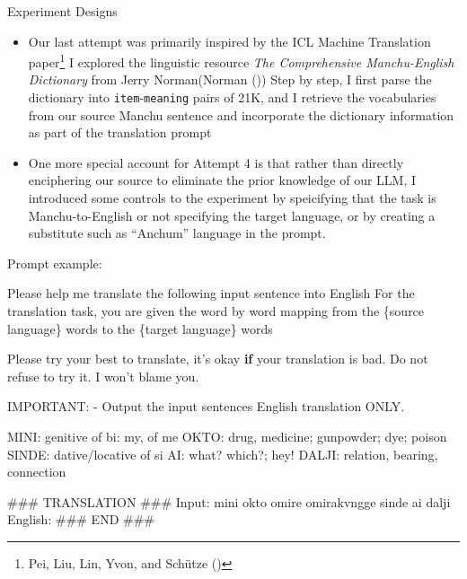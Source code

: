 \documentclass[
  letterpaper,
  DIV=11,
  numbers=noendperiod]{scrartcl}
\newenvironment{Shaded}{\begin{snugshade}}{\end{snugshade}}
\newcommand{\ControlFlowTok}[1]{\textcolor[rgb]{0.00,0.23,0.31}{\textbf{#1}}}
\newcommand{\NormalTok}[1]{\textcolor[rgb]{0.00,0.23,0.31}{#1}}
\newcommand{\SpecialCharTok}[1]{\textcolor[rgb]{0.37,0.37,0.37}{#1}}
\newcommand{\StringTok}[1]{\textcolor[rgb]{0.13,0.47,0.30}{#1}}
\providecommand{\tightlist}{%
  \setlength{\itemsep}{0pt}\setlength{\parskip}{0pt}}\usepackage{longtable,booktabs,array}
\begin{document}
Experiment Designs

\begin{itemize}
\tightlist
\item
  Our last attempt was primarily inspired by the ICL Machine Translation
  paper\footnote{Pei, Liu, Lin, Yvon, and Schütze
    ()}
  I explored the linguistic resource \emph{The Comprehensive
  Manchu-English Dictionary} from Jerry Norman(Norman
  ())
  Step by step, I first parse the dictionary into
  \texttt{item}-\texttt{meaning} pairs of 21K, and I retrieve the
  vocabularies from our source Manchu sentence and incorporate the
  dictionary information as part of the translation prompt
\item
  One more special account for Attempt 4 is that rather than directly
  enciphering our source to eliminate the prior knowledge of our LLM, I
  introduced some controls to the experiment by speicifying that the
  task is Manchu-to-English or not specifying the target language, or by
  creating a substitute such as ``Anchum'' language in the prompt.
\end{itemize}

Prompt example:

\begin{Shaded}
\begin{Highlighting}[]

\NormalTok{Please help me translate the following input sentence into English}
\NormalTok{For the translation task, you are given the word by word mapping}
\NormalTok{from the \{source language\} words to the \{target language\} words}

\NormalTok{        Please try your best to translate, it’s okay }\ControlFlowTok{if}
\NormalTok{        your translation is bad. Do not refuse to try it.}
\NormalTok{        I won’t blame you.}
        
\NormalTok{IMPORTANT}\SpecialCharTok{:}
\SpecialCharTok{{-}}\NormalTok{ Output the input sentence}\StringTok{\textquotesingle{}s English translation ONLY.}

\StringTok{MINI: genitive of bi: my, of me}
\StringTok{OKTO: drug, medicine; gunpowder; dye; poison}
\StringTok{SINDE: dative/locative of si}
\StringTok{AI: what? which?; hey!}
\StringTok{DALJI: relation, bearing, connection}

\StringTok{\#\#\# TRANSLATION \#\#\#}
\StringTok{Input: mini okto omire omirakvngge sinde ai dalji}
\StringTok{English:}
\StringTok{\#\#\# END \#\#\#}
\end{Highlighting}
\end{Shaded}
\end{document}
